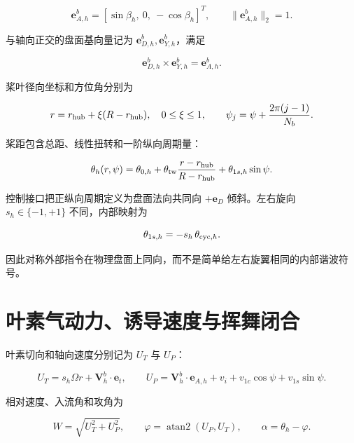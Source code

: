 \documentclass[UTF8,12pt,oneside,openany,fontset=windows]{ctexbook}
\begin{document}
\begin{equation}
\mathbf e_{A,h}^b=[\sin\beta_h,\ 0,\ -\cos\beta_h]^T,\qquad
\|\mathbf e_{A,h}^b\|_2=1.
\end{equation}

与轴向正交的盘面基向量记为 \(\mathbf e_{D,h}^b,\mathbf e_{Y,h}^b\)，满足

\begin{equation}
\mathbf e_{D,h}^b\times\mathbf e_{Y,h}^b=\mathbf e_{A,h}^b.
\end{equation}

桨叶径向坐标和方位角分别为

\begin{equation}
r=r_{\rm hub}+\xi(R-r_{\rm hub}),\quad 0\le\xi\le1,\qquad
\psi_j=\psi+\frac{2\pi(j-1)}{N_b}.
\end{equation}

桨距包含总距、线性扭转和一阶纵向周期量：

\begin{equation}
\theta_h(r,\psi)=\theta_{0,h}+\theta_{\rm tw}\frac{r-r_{\rm hub}}{R-r_{\rm hub}}
+\theta_{1s,h}\sin\psi .
\end{equation}

控制接口把正纵向周期定义为盘面法向共同向 \(+\mathbf e_D\) 倾斜。左右旋向 \(s_h\in\{-1,+1\}\) 不同，内部映射为

\begin{equation}
\theta_{1s,h}=-s_h\,\theta_{{\rm cyc},h}.
\end{equation}

因此对称外部指令在物理盘面上同向，而不是简单给左右旋翼相同的内部谐波符号。

\section{叶素气动力、诱导速度与挥舞闭合}

叶素切向和轴向速度分别记为 \(U_T\) 与 \(U_P\)：

\begin{equation}
U_T=s_h\Omega r+\mathbf V_h^b\cdot\mathbf e_t,\qquad
U_P=\mathbf V_h^b\cdot\mathbf e_{A,h}+v_i+v_{1c}\cos\psi+v_{1s}\sin\psi.
\end{equation}

相对速度、入流角和攻角为

\begin{equation}
W=\sqrt{U_T^2+U_P^2},\qquad
\varphi=\operatorname{atan2}(U_P,U_T),\qquad
\alpha=\theta_h-\varphi .
\end{equation}
\end{document}
